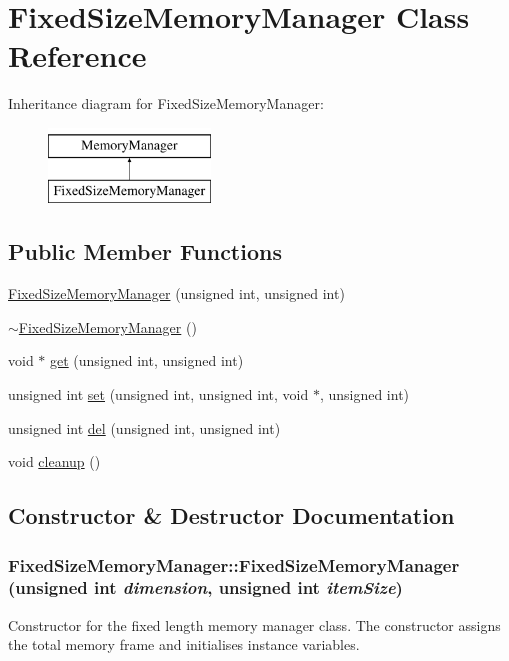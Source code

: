 \hypertarget{classFixedSizeMemoryManager}{
\section{FixedSizeMemoryManager Class Reference}
\label{classFixedSizeMemoryManager}
}
Inheritance diagram for FixedSizeMemoryManager:\begin{figure}[H]
\begin{center}
\leavevmode
\includegraphics[height=2cm]{classFixedSizeMemoryManager}
\end{center}
\end{figure}
\subsection*{Public Member Functions}
\begin{DoxyCompactItemize}
\item 
\hyperlink{classFixedSizeMemoryManager_a6308e2a1c22a22b51a926e8cdfb16cfc}{FixedSizeMemoryManager} (unsigned int, unsigned int)
\item 
\hyperlink{classFixedSizeMemoryManager_af7977c53d24fc453ec41a1cd9663d922}{$\sim$FixedSizeMemoryManager} ()
\item 
void $\ast$ \hyperlink{classFixedSizeMemoryManager_a25a2676e266db960adffab1630323e70}{get} (unsigned int, unsigned int)
\item 
unsigned int \hyperlink{classFixedSizeMemoryManager_a10ce34ce45161cf96e5e1232b8f45894}{set} (unsigned int, unsigned int, void $\ast$, unsigned int)
\item 
unsigned int \hyperlink{classFixedSizeMemoryManager_afad762c113d7a31766d3bff489ede569}{del} (unsigned int, unsigned int)
\item 
void \hyperlink{classFixedSizeMemoryManager_a1661dd249c37ba16c409c9155985429c}{cleanup} ()
\end{DoxyCompactItemize}


\subsection{Constructor \& Destructor Documentation}
\hypertarget{classFixedSizeMemoryManager_a6308e2a1c22a22b51a926e8cdfb16cfc}{
\subsubsection[{FixedSizeMemoryManager}]{\setlength{\rightskip}{0pt plus 5cm}FixedSizeMemoryManager::FixedSizeMemoryManager (unsigned int {\em dimension}, \/  unsigned int {\em itemSize})}}
\label{classFixedSizeMemoryManager_a6308e2a1c22a22b51a926e8cdfb16cfc}
Constructor for the fixed length memory manager class. The constructor assigns the total memory frame and initialises instance variables.


